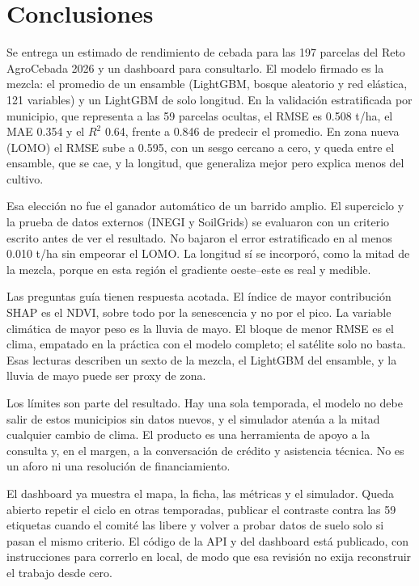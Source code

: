 \section{Conclusiones}

Se entrega un estimado de rendimiento de cebada para las 197 parcelas del Reto AgroCebada 2026 y un dashboard para consultarlo. El modelo firmado es la mezcla: el promedio de un ensamble (LightGBM, bosque aleatorio y red elástica, 121 variables) y un LightGBM de solo longitud. En la validación estratificada por municipio, que representa a las 59 parcelas ocultas, el RMSE es 0.508 t/ha, el MAE 0.354 y el $R^{2}$ 0.64, frente a 0.846 de predecir el promedio. En zona nueva (LOMO) el RMSE sube a 0.595, con un sesgo cercano a cero, y queda entre el ensamble, que se cae, y la longitud, que generaliza mejor pero explica menos del cultivo.

Esa elección no fue el ganador automático de un barrido amplio. El superciclo y la prueba de datos externos (INEGI y SoilGrids) se evaluaron con un criterio escrito antes de ver el resultado. No bajaron el error estratificado en al menos 0.010 t/ha sin empeorar el LOMO. La longitud sí se incorporó, como la mitad de la mezcla, porque en esta región el gradiente oeste–este es real y medible.

Las preguntas guía tienen respuesta acotada. El índice de mayor contribución SHAP es el NDVI, sobre todo por la senescencia y no por el pico. La variable climática de mayor peso es la lluvia de mayo. El bloque de menor RMSE es el clima, empatado en la práctica con el modelo completo; el satélite solo no basta. Esas lecturas describen un sexto de la mezcla, el LightGBM del ensamble, y la lluvia de mayo puede ser proxy de zona.

Los límites son parte del resultado. Hay una sola temporada, el modelo no debe salir de estos municipios sin datos nuevos, y el simulador atenúa a la mitad cualquier cambio de clima. El producto es una herramienta de apoyo a la consulta y, en el margen, a la conversación de crédito y asistencia técnica. No es un aforo ni una resolución de financiamiento.

El dashboard ya muestra el mapa, la ficha, las métricas y el simulador. Queda abierto repetir el ciclo en otras temporadas, publicar el contraste contra las 59 etiquetas cuando el comité las libere y volver a probar datos de suelo solo si pasan el mismo criterio. El código de la API y del dashboard está publicado, con instrucciones para correrlo en local, de modo que esa revisión no exija reconstruir el trabajo desde cero.
